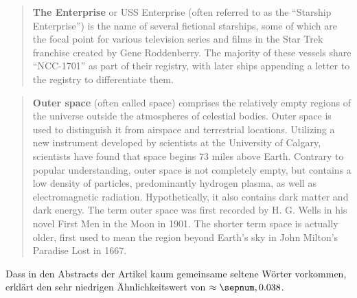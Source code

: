 \begin{quote}
\textbf{The Enterprise} or USS Enterprise (often referred to as the ``Starship Enterprise'') is the name of several fictional starships, some of which are the focal point for various television series and films in the Star Trek franchise created by Gene Roddenberry. The majority of these vessels share ``NCC-1701'' as part of their registry, with later ships appending a letter to the registry to differentiate them. 
\end{quote}

\begin{quote}
\textbf{Outer space} (often called space) comprises the relatively empty regions of the universe outside the atmospheres of celestial bodies. Outer space is used to distinguish it from airspace and terrestrial locations. Utilizing a new instrument developed by scientists at the University of Calgary, scientists have found that space begins 73 miles above Earth. Contrary to popular understanding, outer space is not completely empty, but contains a low density of particles, predominantly hydrogen plasma, as well as electromagnetic radiation. Hypothetically, it also contains dark matter and dark energy. The term outer space was first recorded by H. G. Wells in his novel First Men in the Moon in 1901. The shorter term space is actually older, first used to mean the region beyond Earth's sky in John Milton's Paradise Lost in 1667.
\end{quote}

Dass in den Abstracts der Artikel kaum gemeinsame seltene Wörter vorkommen, erklärt den sehr niedrigen Ähnlichkeitswert von $\approx \val{0.038}$.
